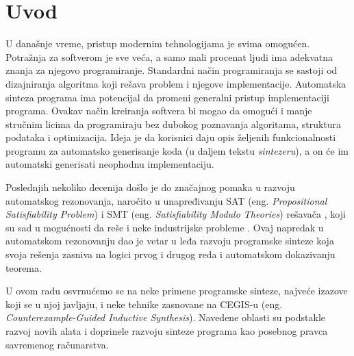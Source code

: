 \section{Uvod}
\label{sec:uvod}

U današnje vreme, pristup modernim tehnologijama je svima omogućen. Potražnja za softverom je sve veća, a samo mali procenat ljudi ima adekvatna
znanja za njegovo programiranje. Standardni način programiranja se sastoji od dizajniranja algoritma koji rešava problem i njegove implementacije. Automatska sinteza programa ima potencijal da promeni generalni pristup implementaciji programa. Ovakav način kreiranja softvera bi mogao da omogući i manje stručnim licima da programiraju bez dubokog poznavanja algoritama, struktura podataka i optimizacija.
Ideja je da korisnici daju opis željenih funkcionalnosti programu za automatsko generisanje koda (u daljem tekstu \emph{sintezeru}), a on će im automatski generisati neophodnu implementaciju.

Poslednjih nekoliko decenija došlo je do značajnog pomaka u razvoju automatskog rezonovanja, naročito u unapređivanju SAT (eng. \emph{Propositional Satisfiability Problem}) i SMT (eng. \emph{Satisfiability Modulo Theories}) rešavača \cite{SMT}, koji su sad u mogućnosti da reše i neke industrijske probleme \cite{PSE}. Ovaj napredak u automatskom rezonovanju dao je vetar u leđa razvoju programske sinteze koja svoja rešenja zasniva na logici prvog i drugog reda i automatskom dokazivanju teorema.

U ovom radu osvrnućemo se na neke primene programske sinteze, najveće izazove koji se u njoj javljaju, i neke tehnike zasnovane na CEGIS-u (eng. \emph{Counterexample-Guided Inductive Synthesis}). Navedene oblasti su podstakle razvoj novih alata i doprinele razvoju sinteze programa kao posebnog pravca savremenog računarstva.
